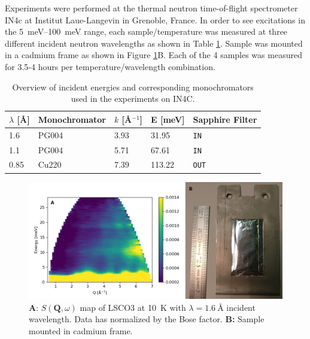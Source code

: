 Experiments were performed at the thermal neutron time-of-flight spectrometer IN4c at Institut Laue-Langevin in Grenoble, France. In order to see excitations in the \SIrange{5}{100}{\milli\eV} range, each sample/temperature was measured at three different incident neutron wavelengths as shown in Table \ref{tab:in4_mono}. Sample was mounted in a cadmium frame as shown in Figure \ref{fig:sample_sqw}B. Each of the 4 samples was measured for 3.5-4 hours per temperature/wavelength combination.

\begin{table}
    \caption[IN4: Incident energies]{Overview of incident energies and corresponding monochromators used in the experiments on IN4C.}
    \label{tab:in4_mono}
    \centering
    \begin{tabular}{lllll}\toprule
    $\lambda$ [\AA] & Monochromator  & $k$ [\AA$^{-1}$] & E [meV] & Sapphire Filter     \\ \midrule
    1.6             & PG004 & 3.93            & 31.95   & \texttt{IN}  \\
    1.1             & PG004 & 5.71            & 67.61   & \texttt{IN}  \\
    0.85            & Cu220 & 7.39            & 113.22  & \texttt{OUT} \\ \bottomrule
    \end{tabular}
\end{table}

\begin{figure}
    \centering
    \includegraphics[width=\textwidth]{fig/gdos/sample_sqw.png}
    \caption[$S(\bm{Q}, \omega)$ map and picture of sample]{\textbf{A}: $S(\bm{Q}, \omega)$ map of LSCO3 at \SI{10}{K} with $\lambda = \SI{1.6}{\angstrom}$ incident wavelength. Data has normalized by the Bose factor. \textbf{B:} Sample mounted in cadmium frame.}
    \label{fig:sample_sqw}
\end{figure}

